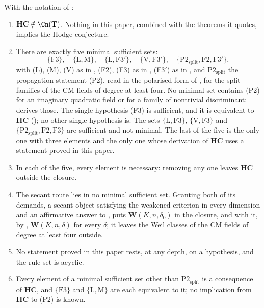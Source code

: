 \begin{theorem}\label{thm:closure}
With the notation of :
\begin{enumerate}[label=\textup{(\roman*)},leftmargin=2.6em]
\item $\mathbf{HC}\notin\Cn(\mathbf{T})$. Nothing in this paper, combined with the
  theorems it quotes, implies the Hodge conjecture.
\item There are exactly five minimal sufficient sets:
  \[
    \{\mathrm{F3}\},\quad\{\mathrm{L},\mathrm{M}\},\quad
    \{\mathrm{L},\mathrm{F3}'\},\quad\{\mathrm{V},\mathrm{F3}'\},\quad
    \{\mathrm{P2}_{\mathrm{split}},\mathrm{F2},\mathrm{F3}'\},
  \]
  with \textup{(L)}, \textup{(M)}, \textup{(V)} as in ,
  \textup{(F2)}, \textup{(F3)} as in , (F3$'$) as in
  , and $\mathrm{P2}_{\mathrm{split}}$ the propagation
  statement \textup{(P2)}, read in the polarised form of \cite[Remark~3.6]{paperII},
  for the split families of the CM fields of degree at least four. No
  minimal set contains \textup{(P2)} for an imaginary quadratic field or for
  a family of nontrivial discriminant:  derives those.
  The single hypothesis (F3) is sufficient, and it is equivalent to
  $\mathbf{HC}$ (); no other single hypothesis is.
  The sets $\{\mathrm{L},\mathrm{F3}\}$, $\{\mathrm{V},\mathrm{F3}\}$ and
  $\{\mathrm{P2}_{\mathrm{split}},\mathrm{F2},\mathrm{F3}\}$ are sufficient and
  not minimal. The last of the five is the only one with three elements and the
  only one whose derivation of $\mathbf{HC}$ uses a statement proved in this
  paper.
\item In each of the five, every element is necessary: removing any one
  leaves $\mathbf{HC}$ outside the closure.
\item The secant route lies in no minimal sufficient set. Granting both of its
  demands, a secant object satisfying the weakened criterion in every
  dimension and an affirmative answer to \cite[Question 11.4]{Mar25b}, puts
  $\mathbf{W}(K,n,\delta_{0})$ in the closure, and with it, by
  , $\mathbf{W}(K,n,\delta)$ for every $\delta$; it leaves
  the Weil classes of the CM fields of degree at least four outside.
\item No statement proved in this paper rests, at any depth, on a
  hypothesis, and the rule set is acyclic.
\item Every element of a minimal sufficient set other than
  $\mathrm{P2}_{\mathrm{split}}$ is a consequence of $\mathbf{HC}$, and $\{\mathrm{F3}\}$ and
  $\{\mathrm{L},\mathrm{M}\}$ are each equivalent to it; no implication from
  $\mathbf{HC}$ to \textup{(P2)} is known.
\end{enumerate}
\end{theorem}

